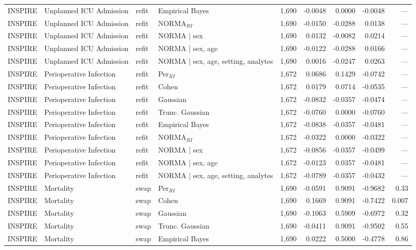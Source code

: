 \begin{table}[ht]
\begin{tabular}{ll l l r r r r r}
INSPIRE & Unplanned ICU Admission & refit & Empirical Bayes & 1,690 & -0.0048 & 0.0000 & -0.0048 & --- \\
INSPIRE & Unplanned ICU Admission & refit & NORMA$_{RI}$ & 1,690 & -0.0150 & -0.0288 & 0.0138 & --- \\
INSPIRE & Unplanned ICU Admission & refit & NORMA | sex & 1,690 & 0.0132 & -0.0082 & 0.0214 & --- \\
INSPIRE & Unplanned ICU Admission & refit & NORMA | sex, age & 1,690 & -0.0122 & -0.0288 & 0.0166 & --- \\
INSPIRE & Unplanned ICU Admission & refit & NORMA | sex, age, setting, analytes & 1,690 & 0.0016 & -0.0247 & 0.0263 & --- \\
INSPIRE & Perioperative Infection & refit & Per$_{RI}$ & 1,672 & 0.0686 & 0.1429 & -0.0742 & --- \\
INSPIRE & Perioperative Infection & refit & Cohen & 1,672 & 0.0179 & 0.0714 & -0.0535 & --- \\
INSPIRE & Perioperative Infection & refit & Gaussian & 1,672 & -0.0832 & -0.0357 & -0.0474 & --- \\
INSPIRE & Perioperative Infection & refit & Trunc. Gaussian & 1,672 & -0.0760 & 0.0000 & -0.0760 & --- \\
INSPIRE & Perioperative Infection & refit & Empirical Bayes & 1,672 & -0.0838 & -0.0357 & -0.0481 & --- \\
INSPIRE & Perioperative Infection & refit & NORMA$_{RI}$ & 1,672 & -0.0322 & 0.0000 & -0.0322 & --- \\
INSPIRE & Perioperative Infection & refit & NORMA | sex & 1,672 & -0.0856 & -0.0357 & -0.0499 & --- \\
INSPIRE & Perioperative Infection & refit & NORMA | sex, age & 1,672 & -0.0123 & 0.0357 & -0.0481 & --- \\
INSPIRE & Perioperative Infection & refit & NORMA | sex, age, setting, analytes & 1,672 & -0.0789 & -0.0357 & -0.0432 & --- \\
INSPIRE & Mortality & swap & Per$_{RI}$ & 1,690 & -0.0591 & 0.9091 & -0.9682 & 0.33 \\
INSPIRE & Mortality & swap & Cohen & 1,690 & 0.1669 & 0.9091 & -0.7422 & 0.007 \\
INSPIRE & Mortality & swap & Gaussian & 1,690 & -0.1063 & 0.5909 & -0.6972 & 0.32 \\
INSPIRE & Mortality & swap & Trunc. Gaussian & 1,690 & -0.0411 & 0.9091 & -0.9502 & 0.55 \\
INSPIRE & Mortality & swap & Empirical Bayes & 1,690 & 0.0222 & 0.5000 & -0.4778 & 0.86 \\

\end{tabular}
\end{table}
